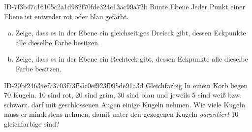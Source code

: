 \begin{exercise}
      {ID-7f3b47c16105c2a1d982f70fde324c13ac99a72b}
      {Bunte Ebene}
  \ifproblem\problem
    Jeder Punkt einer Ebene ist entweder rot oder blau gefärbt.
    \begin{enumerate}[a)]
      \item Zeige, dass es in der Ebene ein gleichseitiges Dreieck gibt,
            dessen Eckpunkte alle dieselbe Farbe besitzen.
      \item Zeige, dass es in der Ebene ein Rechteck gibt,
            dessen Eckpunkte alle dieselbe Farbe besitzen.
    \end{enumerate}
  \fi
\end{exercise}

\begin{exercise}
      {ID-20bf24634ef73703f73f55c0ef923f095de91a3d}
      {Gleichfarbig}
  \ifproblem\problem
    In einem Korb liegen 70 Kugeln. 10 sind rot, 20 sind grün, 30 sind blau
    und jeweils 5 sind weiß bzw. schwarz. \xya{} darf mit geschlossenen Augen
    einige Kugeln nehmen. Wie viele Kugeln muss er mindestens nehmen, damit
    unter den gezogenen Kugeln \emph{garantiert} 10 gleichfarbige sind?
  \fi
\end{exercise}

%

